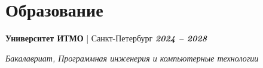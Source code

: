 \documentclass[a4paper,11pt]{article}
\newcommand{\entry}[3]{%
  \noindent\textbf{#1} | #2 \hfill \textbf{\textit{#3}} \par
}
\begin{document}
\section*{Образование}
\entry{Университет ИТМО}{Санкт-Петербург}{2024 – 2028}
\textit{Бакалавриат, Программная инженерия и компьютерные технологии}
\end{document}
